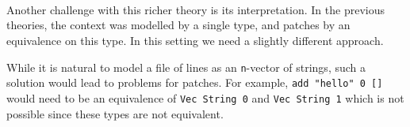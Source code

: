 \begin{code}[hide]
\>[2]\AgdaSymbol{(}\AgdaSpace{}%
\AgdaSpace{}%
\AgdaSpace{}%
\AgdaBound{\AgdaUnderscore{}}\AgdaSpace{}%
\AgdaSpace{}%
\AgdaSymbol{)}\AgdaSpace{}%
\AgdaSpace{}%
\AgdaSpace{}%
\AgdaSpace{}%
\AgdaSpace{}%
\AgdaSpace{}%
\AgdaSymbol{(}\AgdaSpace{}%
\AgdaSymbol{)}\AgdaSpace{}%
\AgdaSymbol{)}\AgdaSpace{}%
\AgdaSymbol{)}\<%
\\
%
\\[\AgdaEmptyExtraSkip]%
\>[0]\AgdaSpace{}%
\AgdaSymbol{:}\AgdaSpace{}%
\AgdaSymbol{\{}\AgdaSpace{}%
\AgdaSpace{}%
\AgdaSymbol{:}\AgdaSpace{}%
\AgdaSymbol{\}}\AgdaSpace{}%
\AgdaSymbol{\{}\AgdaSpace{}%
\AgdaSymbol{:}\AgdaSpace{}%
\AgdaSymbol{\}}\AgdaSpace{}%
\AgdaSymbol{\{}\AgdaSpace{}%
\AgdaSymbol{:}\AgdaSpace{}%
\AgdaSymbol{\}}\AgdaSpace{}%
\AgdaSpace{}%
\AgdaSymbol{(}\AgdaSpace{}%
\AgdaSpace{}%
\AgdaSpace{}%
\AgdaSpace{}%
\AgdaSymbol{)}\AgdaSpace{}%
\AgdaSpace{}%
\AgdaSpace{}%
\AgdaSpace{}%
\AgdaSpace{}%
\AgdaSpace{}%
\<%
\\
\>[0]\AgdaSpace{}%
\AgdaSymbol{\{}\AgdaSpace{}%
\AgdaSymbol{=}\AgdaSpace{}%
\AgdaSymbol{\}}\AgdaSpace{}%
\AgdaSymbol{\{}\AgdaSpace{}%
\AgdaSymbol{=}\AgdaSpace{}%
\AgdaSymbol{\}}\AgdaSpace{}%
\AgdaSpace{}%
\AgdaSymbol{=}\AgdaSpace{}%
\AgdaSpace{}%
\AgdaSpace{}%
\AgdaSymbol{(}\AgdaSpace{}%
\AgdaSymbol{)}\AgdaSpace{}%
\AgdaSymbol{(}\AgdaSpace{}%
\AgdaSymbol{)}\<%
\end{code}
Another challenge with this richer theory is its interpretation. In the previous theories,
the context was modelled by a single type, and patches by an equivalence on this type.
In this setting we need a slightly different approach.

While it is natural to model a file of  lines as an \texttt{n}-vector of strings,
such a solution would lead to problems for patches. For example, \texttt{add~"hello"~0~[]} would need
to be an equivalence of \texttt{Vec String 0} and \texttt{Vec String 1} which is not possible
since these types are not equivalent.

